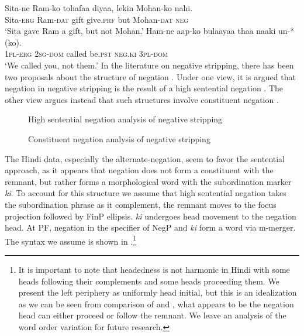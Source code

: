 \documentclass[output=paper]{langscibook}
\begin{document}
\ea \label{maex29}
    \gll Sita-ne Ram-ko tohafaa diyaa, lekin Mohan-ko nahi.\\
    Sita-\textsc{erg} Ram-\textsc{dat} gift give.\textsc{prf} but Mohan-\textsc{dat} \textsc{neg}\\
    \glt `Sita gave Ram a gift, but not Mohan.'
\ex \label{maex30}
    \gll Ham-ne aap-ko bulaayaa thaa naaki un-*(ko).\\
    \textsc{1pl-erg} \textsc{2sg-dom} called be.\textsc{pst} \textsc{neg.ki} \textsc{3pl-dom}\\
    \glt `We called you, not them.'
\z 
In the literature on negative stripping, there has been two proposals about the structure of negation \citep{merchant03,wurmbrand17,dendikken18}. Under one view, it is argued that negation in negative stripping is the result of a high sentential negation . The other view argues instead that such structures involve constituent negation .

\begin{figure}
\begin{floatrow}
\captionsetup{margin=.05\linewidth}
        {\caption{High sentential negation analysis of negative stripping\label{maex31}}}
        {\caption{Constituent negation analysis of negative stripping\label{maex32}}}
\end{floatrow}
\end{figure}
    
The Hindi data, especially the alternate-negation, seem to favor the sentential approach, as it appears that negation does not form a constituent with the remnant, but rather forms a morphological word with the subordination marker \emph{ki}. To account for this structure we assume that high sentential negation takes the subordination phrase as it complement, the remnant moves to the focus projection followed by FinP ellipsis. \emph{ki} undergoes head movement to the negation head. At PF, negation in the specifier of NegP and \emph{ki} form a word via m-merger. The syntax we assume is shown in .\footnote{It is important to note that headedness is not harmonic in Hindi with some heads following their complements and some heads proceeding them. We present the left periphery as uniformly head initial, but this is an idealization as we can be seen from comparison of  and , what appears to be the negation head can either proceed or follow the remnant. We leave an analysis of the word order variation for future research.}
\end{document}
